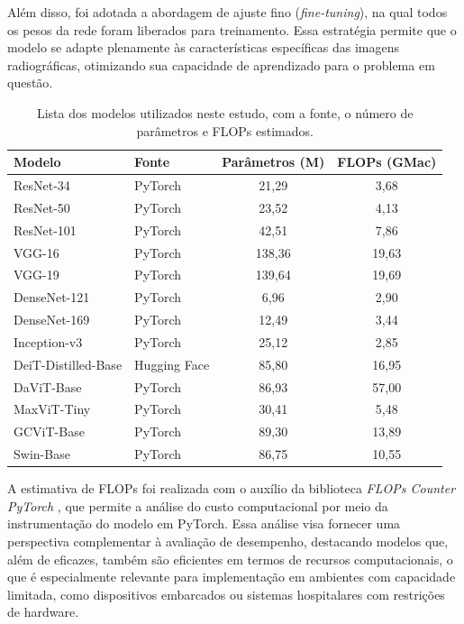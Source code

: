 Além disso, foi adotada a abordagem de ajuste fino (\textit{fine-tuning}), na qual todos os pesos da rede foram liberados para treinamento. Essa estratégia permite que o modelo se adapte plenamente às características específicas das imagens radiográficas, otimizando sua capacidade de aprendizado para o problema em questão.

\begin{table}[!htbp]
    \centering
    \begin{tabular}{|l|l|c|c|}
        \hline
        \textbf{Modelo} & \textbf{Fonte} & \textbf{Parâmetros (M)} & \textbf{FLOPs (GMac)} \\
        \hline
        ResNet-34 & PyTorch & 21,29 & 3,68 \\
        \hline
        ResNet-50 & PyTorch & 23,52 & 4,13 \\
        \hline
        ResNet-101 & PyTorch & 42,51 & 7,86 \\
        \hline
        VGG-16 & PyTorch & 138,36 & 19,63 \\
        \hline
        VGG-19 & PyTorch & 139,64 & 19,69 \\
        \hline
        DenseNet-121 & PyTorch & 6,96 & 2,90 \\
        \hline
        DenseNet-169 & PyTorch & 12,49 & 3,44 \\
        \hline
        Inception-v3 & PyTorch & 25,12 & 2,85 \\
        \hline
        DeiT-Distilled-Base & Hugging Face & 85,80 & 16,95 \\
        \hline
        DaViT-Base & PyTorch & 86,93 & 57,00 \\
        \hline
        MaxViT-Tiny & PyTorch & 30,41 & 5,48 \\
        \hline
        GCViT-Base & PyTorch & 89,30 & 13,89 \\
        \hline
        Swin-Base & PyTorch & 86,75 & 10,55 \\
        \hline
    \end{tabular}
    \caption{Lista dos modelos utilizados neste estudo, com a fonte, o número de parâmetros e FLOPs estimados.}
    \label{tab:model_list}
\end{table}

A estimativa de FLOPs foi realizada com o auxílio da biblioteca \textit{FLOPs Counter PyTorch} \cite{ptflops}, que permite a análise do custo computacional por meio da instrumentação do modelo em PyTorch. Essa análise visa fornecer uma perspectiva complementar à avaliação de desempenho, destacando modelos que, além de eficazes, também são eficientes em termos de recursos computacionais, o que é especialmente relevante para implementação em ambientes com capacidade limitada, como dispositivos embarcados ou sistemas hospitalares com restrições de hardware.

